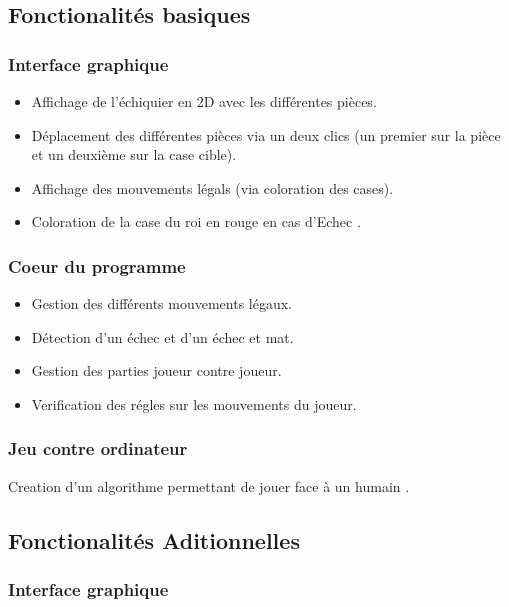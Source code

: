 \documentclass{article}
\begin{document}
\subsection{Fonctionalités basiques}

\subsubsection{Interface graphique}

\begin{itemize}

\item Affichage de l'échiquier en 2D avec les différentes pièces.
\item Déplacement des différentes pièces via un deux clics (un premier sur la pièce et un deuxième sur la case cible).
\item Affichage des mouvements légals (via coloration des cases).
\item Coloration de la case du roi en rouge en cas d'Echec .

\end{itemize}

\subsubsection{Coeur du programme}

\begin{itemize}

\item Gestion des différents mouvements légaux.
\item Détection d'un échec et d'un échec et mat.
\item Gestion des parties joueur contre joueur.
\item Verification des régles sur les mouvements du joueur.
\end{itemize}

\subsubsection{Jeu contre ordinateur}

Creation d'un algorithme permettant de jouer face à un humain .

\subsection{Fonctionalités Aditionnelles}

\subsubsection{Interface graphique}
\end{document}
